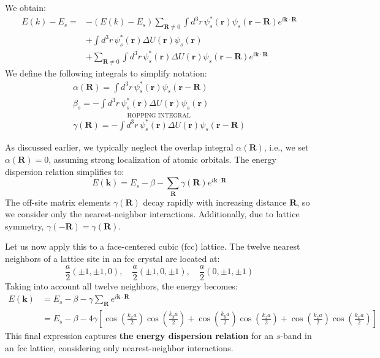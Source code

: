 We obtain:
\begin{align*}
	E(k) - E_s = & - (E(k) - E_s) \sum_{\mathbf{R} \neq 0} \int d^3r \, \psi_s^*(\mathbf{r}) \psi_s(\mathbf{r} - \mathbf{R}) e^{i\mathbf{k} \cdot \mathbf{R}}         \\
	             & + \int d^3r \, \psi_s^*(\mathbf{r}) \Delta U(\mathbf{r}) \psi_s(\mathbf{r})                                                                        \\
	             & + \sum_{\mathbf{R} \neq 0} \int d^3r \, \psi_s^*(\mathbf{r}) \Delta U(\mathbf{r}) \psi_s(\mathbf{r} - \mathbf{R}) e^{i\mathbf{k} \cdot \mathbf{R}}
\end{align*}
We define the following integrals to simplify notation:
\begin{align}
	\boxed{
		\alpha(\mathbf{R}) = \int d^3r \, \psi_s^*(\mathbf{r}) \psi_s(\mathbf{r} - \mathbf{R})
	} \\[8pt]
	\boxed{
		\beta_s = -\int d^3r \, \psi_s^*(\mathbf{r}) \Delta U(\mathbf{r}) \psi_s(\mathbf{r})
	} \\[8pt]
	\overset{\text{HOPPING INTEGRAL} \,}{\boxed{
			\gamma(\mathbf{R}) = -\int d^3r \, \psi_s^*(\mathbf{r}) \Delta U(\mathbf{r}) \psi_s(\mathbf{r} - \mathbf{R})
		}}
\end{align}

As discussed earlier, we typically neglect the overlap integral \( \alpha(\mathbf{R}) \), i.e., we set \( \alpha(\mathbf{R}) = 0 \), assuming strong localization of atomic orbitals. The energy dispersion relation simplifies to:
\begin{equation}
	\boxed{
		E(\mathbf{k}) = E_s - \beta - \sum_{\mathbf{R}} \gamma(\mathbf{R}) e^{i\mathbf{k} \cdot \mathbf{R}}}
\end{equation}
The off-site matrix elements \( \gamma(\mathbf{R}) \) decay rapidly with increasing distance \( \mathbf{R} \), so we consider only the nearest-neighbor interactions. Additionally, due to lattice symmetry, \( \gamma(-\mathbf{R}) = \gamma(\mathbf{R}) \).

Let us now apply this to a face-centered cubic (fcc) lattice. The twelve nearest neighbors of a lattice site in an fcc crystal are located at:
\begin{equation*}
	\frac{a}{2} (\pm1, \pm1, 0), \quad \frac{a}{2} (\pm1, 0, \pm1), \quad \frac{a}{2} (0, \pm1, \pm1)
\end{equation*}
Taking into account all twelve neighbors, the energy becomes:
\begin{align*}
	E(\mathbf{k}) & = E_s - \beta - \gamma \sum_{\mathbf{R}} e^{i\mathbf{k} \cdot \mathbf{R}}                                                                                                                                                                                \\
	              & = E_s - \beta - \boxed{4\gamma} \left[ \cos\left(\frac{k_x a}{2}\right) \cos\left(\frac{k_y a}{2}\right) + \cos\left(\frac{k_y a}{2}\right) \cos\left(\frac{k_z a}{2}\right) + \cos\left(\frac{k_z a}{2}\right) \cos\left(\frac{k_x a}{2}\right) \right]
\end{align*}
This final expression captures \textbf{the energy dispersion relation} for an \(s\)-band in an fcc lattice, considering only nearest-neighbor interactions.

